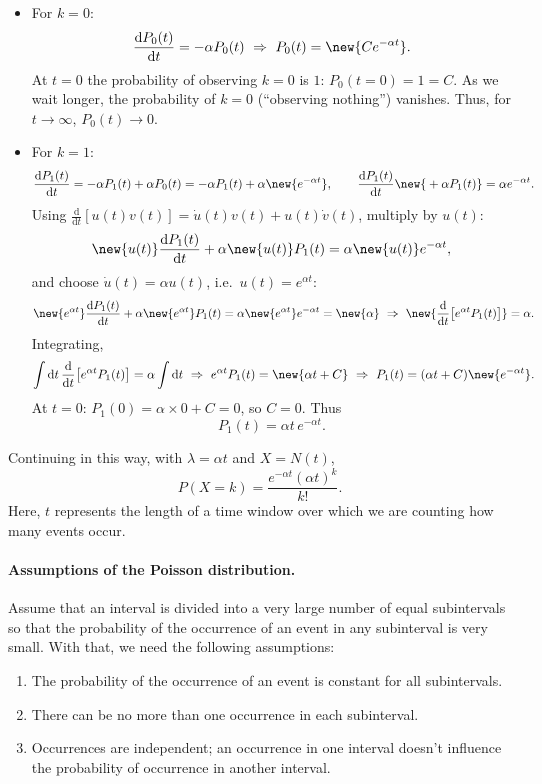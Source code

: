 \begin{itemize}
\item For $k = 0$:
\[
\frac{\mathrm{d}P_0(t)}{\mathrm{d}t} = -\alpha P_0(t) \ \Rightarrow\ P_0(t) = \new{C e^{-\alpha t}}.
\]
At $t = 0$ the probability of observing $k = 0$ is $1$: $P_0(t=0) = 1 = C$. As we wait longer, the probability of $k = 0$ (``observing nothing'') vanishes. Thus, for $t \to \infty$, $P_0(t) \to 0$.

\item For $k = 1$:
\[
\frac{\mathrm{d}P_1(t)}{\mathrm{d}t} = -\alpha P_1(t) + \alpha P_0(t) = -\alpha P_1(t) + \alpha \new{e^{-\alpha t}},
\qquad
\frac{\mathrm{d}P_1(t)}{\mathrm{d}t} \new{{}+ \alpha P_1(t)} = \alpha e^{-\alpha t}.
\]
Using $\frac{\mathrm{d}}{\mathrm{d}t}[u(t)v(t)] = \dot u(t)v(t) + u(t)\dot v(t)$, multiply by $u(t)$:
\[
\new{u(t)}\frac{\mathrm{d}P_1(t)}{\mathrm{d}t} + \alpha \new{u(t)}P_1(t) = \alpha \new{u(t)}e^{-\alpha t},
\]
and choose $\dot u(t) = \alpha u(t)$, i.e.\ $u(t) = e^{\alpha t}$:
\[
\new{e^{\alpha t}}\frac{\mathrm{d}P_1(t)}{\mathrm{d}t} + \alpha \new{e^{\alpha t}}P_1(t) = \alpha \new{e^{\alpha t}}e^{-\alpha t} = \new{\alpha}
\ \Rightarrow\
\new{\frac{\mathrm{d}}{\mathrm{d}t}\big[e^{\alpha t}P_1(t)\big]} = \alpha.
\]
Integrating,
\[
\int \mathrm{d}t\,\frac{\mathrm{d}}{\mathrm{d}t}\big[e^{\alpha t}P_1(t)\big] = \alpha\int \mathrm{d}t
\ \Rightarrow\
e^{\alpha t}P_1(t) = \new{\alpha t + C}
\ \Rightarrow\
P_1(t) = (\alpha t + C)\new{e^{-\alpha t}}.
\]
At $t = 0$: $P_1(0) = \alpha\times 0 + C = 0$, so $C = 0$. Thus
\[
P_1(t) = \alpha t\, e^{-\alpha t}.
\]
\end{itemize}
Continuing in this way, with $\lambda = \alpha t$ and $X = N(t)$,
\[
P(X = k) = \frac{e^{-\alpha t}(\alpha t)^{k}}{k!}.
\]
Here, $t$ represents the length of a time window over which we are counting how many events occur.

\paragraph{Assumptions of the Poisson distribution.}
Assume that an interval is divided into a very large number of equal subintervals so that the probability of the occurrence of an event in any subinterval is very small. With that, we need the following assumptions:
\begin{enumerate}
\item The probability of the occurrence of an event is constant for all subintervals.
\item There can be no more than one occurrence in each subinterval.
\item Occurrences are independent; an occurrence in one interval doesn't influence the probability of occurrence in another interval.
\end{enumerate}

